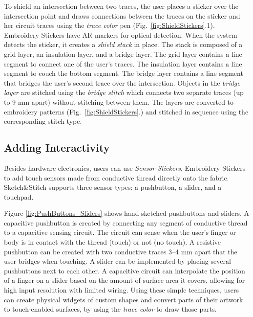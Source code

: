 \documentclass[header.tex]{subfiles}
\begin{document}
To shield an intersection between two traces, the user places a sticker over the intersection point and draws connections between the traces on the sticker and her circuit traces using the \textit{trace color} pen (Fig.\ \ref{fig:ShieldStickers}.1). 
Embroidery Stickers have AR markers for optical detection. 
When the system detects the sticker, it creates a \textit{shield stack} in place. The stack is composed of a grid layer, an insulation layer, and a bridge layer. The grid layer contains a line segment to connect one of the user's traces. The insulation layer contains a line segment to couch the bottom segment. The bridge layer contains a line segment that bridges the user's second trace over the intersection. Objects in the \textit{bridge layer} are stitched using the \textit{bridge stitch} which connects two separate traces (up to 9 mm apart) without stitching between them. The layers are converted to embroidery patterns (Fig.\ \ref{fig:ShieldStickers}.) and stitched in sequence using the corresponding stitch type. 



\subsection{Adding Interactivity}
Besides hardware electronics, users can use \textit{Sensor Stickers}, Embroidery Stickers to add touch sensors made from conductive thread directly onto the fabric. Sketch\&Stitch supports three sensor types: a pushbutton, a slider, and a touchpad.

Figure \ref{fig:PushButtons_Sliders} shows hand-sketched pushbuttons and sliders. A capacitive pushbutton is created by connecting any segment of conductive thread to a capacitive sensing circuit. The circuit can sense when the user's finger or body is in contact with the thread (touch) or not (no touch). A resistive pushbutton can be created with two conductive traces 3--4 mm apart that the user bridges when touching. %
A slider can be implemented by placing several pushbuttons next to each other. %
A capacitive circuit can interpolate the position of a finger on a slider based on the amount of surface area it covers, allowing  for high input resolution with limited wiring.  Using these simple techniques, users can create physical widgets of custom shapes and convert parts of their artwork to touch-enabled surfaces, by using the \textit{trace color} to draw those parts.
\end{document}
